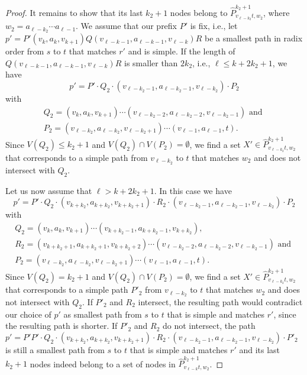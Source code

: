 \documentclass[a4paper,english]{lipics-v2016}
\theoremstyle{plain}
\begin{document}
\begin{proof}
 
 It remains to show that its last $k_2+1$ nodes belong to $\hat{P}^{k_2+1}_{v_{\ell-k_2}t,w_2}$, where $w_2 = a_{\ell-k_2} \cdots a_{\ell-1}$. We assume that our prefix $P'$ is fix, i.e., 
 let $p' = P'(v_{k},a_{k},v_{k+1}) Q (v_{\ell-k-1},a_{\ell-k-1},v_{\ell-k}) R$ be a smallest path in radix order from $s$ to $t$ that matches $r'$ and is simple.
 If the length of $Q (v_{\ell-k-1},a_{\ell-k-1},v_{\ell-k}) R$ is smaller than $2k_2$, i.e., $\ell \leq k + 2k_2 +1$,
 we have $$p' = P' \cdot Q_2 \cdot (v_{\ell-k_2-1},a_{\ell-k_2-1},v_{\ell-k_2}) \cdot  P_2$$ with  \begin{multline*}
 	Q_2=(v_k,a_{k},v_{k+1}) \cdots  (v_{\ell-k_2-2},a_{\ell-k_2-2},v_{\ell-k_2-1}) \text{ and }\\ P_2=(v_{\ell-k_2},a_{\ell-k_2},v_{\ell-k_2+1}) \cdots (v_{\ell-1},a_{\ell-1},t).	
 \end{multline*}
 Since $V(Q_2) \leq k_2+1$ and $V(Q_2) \cap V(P_2) = \emptyset$, we find a set $X' \in \hat{P}^{k_2+1}_{v_{\ell-k_2}t,w_2}$ that corresponds to a simple path from $v_{\ell-k_2}$ to $t$ that matches $w_2$ and does not intersect with $Q_2$. 
 
 Let us now assume that $\ell > k + 2k_2 +1$. In this case we have 
 $$p' = P' \cdot Q_2 \cdot (v_{k+k_2},a_{k+k_2},v_{k+k_2+1})
  \cdot R_2 \cdot (v_{\ell-k_2-1},a_{\ell-k_2-1},v_{\ell-k_2}) \cdot  P_2$$ with 
 \begin{multline*}
 	Q_2=(v_k,a_{k},v_{k+1}) \cdots  (v_{k+k_2-1},a_{k+k_2-1},v_{k+k_2}),\\
 	 R_2 =  (v_{k+k_2+1},a_{k+k_2+1},v_{k+k_2+2}) \cdots  (v_{\ell-k_2-2},a_{\ell-k_2-2},v_{\ell-k_2-1}) \text{ and }\\	 
 	  P_2=(v_{\ell-k_2},a_{\ell-k_2},v_{\ell-k_2+1}) \cdots (v_{\ell-1},a_{\ell-1},t).	
 \end{multline*}
 Since $V(Q_2) = k_2+1$ and $V(Q_2) \cap V(P_2) = \emptyset$, we find a set $X' \in \hat{P}^{k_2+1}_{v_{\ell-k_2}t,w_2}$ that corresponds to a simple path $P'_2$ from $v_{\ell-k_2}$ to $t$ that matches $w_2$ and does not intersect with $Q_2$. 
 If $P'_2$ and $R_2$ intersect, the resulting path would contradict our choice of $p'$ as smallest path from $s$ to $t$ that is simple and matches $r'$, since the resulting path is shorter. 
 If $P'_2$ and $R_2$ do not intersect, the path $p' = P' P' \cdot Q_2 \cdot (v_{k+k_2},a_{k+k_2},v_{k+k_2+1})
 \cdot R_2 \cdot (v_{\ell-k_2-1},a_{\ell-k_2-1},v_{\ell-k_2}) \cdot  P'_2$ is still a smallest path from $s$ to $t$ that is simple and matches $r'$ and its last $k_2+1$ nodes indeed belong to a set of nodes in $\hat{P}^{k_2+1}_{v_{\ell-k}t,w_2}$.
 

\end{proof}
\end{document}
